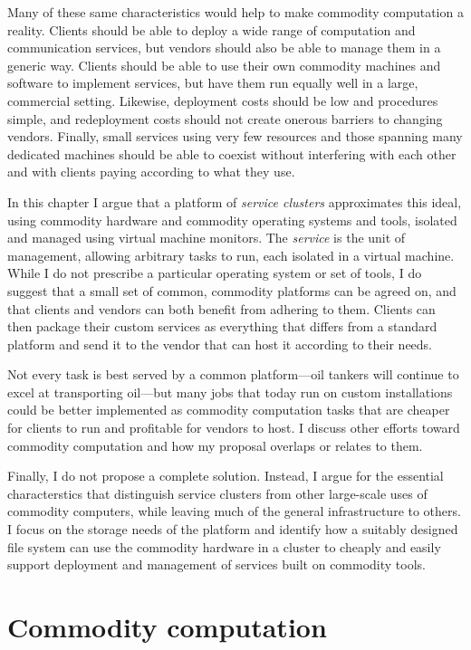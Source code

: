 Many of these same characteristics would help to make commodity computation a reality. Clients should be able to deploy a wide range of computation and communication services, but vendors should also be able to manage them in a generic way. Clients should be able to use their own commodity machines and software to implement services, but have them run equally well in a large, commercial setting. Likewise, deployment costs should be low and procedures simple, and redeployment costs should not create onerous barriers to changing vendors. Finally, small services using very few resources and those spanning many dedicated machines should be able to coexist without interfering with each other and with clients paying according to what they use.

In this chapter I argue that a platform of \emph{service clusters} approximates this ideal, using commodity hardware and commodity operating systems and tools, isolated and managed using virtual machine monitors. The \emph{service} is the unit of management, allowing arbitrary tasks to run, each isolated in a virtual machine. While I do not prescribe a particular operating system or set of tools, I do suggest that a small set of common, commodity platforms can be agreed on, and that clients and vendors can both benefit from adhering to them. Clients can then package their custom services as everything that differs from a standard platform and send it to the vendor that can host it according to their needs.

Not every task is best served by a common platform---oil tankers will continue to excel at transporting oil---but many jobs that today run on custom installations could be better implemented as commodity computation tasks that are cheaper for clients to run and profitable for vendors to host. I discuss other efforts toward commodity computation and how my proposal overlaps or relates to them.

Finally, I do not propose a complete solution. Instead, I argue for the essential characterstics that distinguish service clusters from other large-scale uses of commodity computers, while leaving much of the general infrastructure to others. I focus on the storage needs of the platform and identify how a suitably designed file system can use the commodity hardware in a cluster to cheaply and easily support deployment and management of services built on commodity tools.

\section{Commodity computation}

